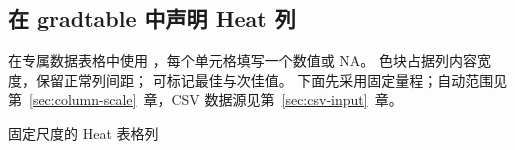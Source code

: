 \subsection{在 gradtable 中声明 Heat 列}
在专属数据表格中使用 ，每个单元格填写一个数值或 NA。
色块占据列内容宽度，保留正常列间距； 可标记最佳与次佳值。
下面先采用固定量程；自动范围见第~\ref{sec:column-scale}~章，CSV 数据源见第~\ref{sec:csv-input}~章。
\begin{example}[text and listing,sidebyside=false]{固定尺度的 Heat 表格列}
\begin{center}
\begin{gradtable}[align=c,header align=c,width=\linewidth]
\end{gradtable}
\end{center}
\end{example}
